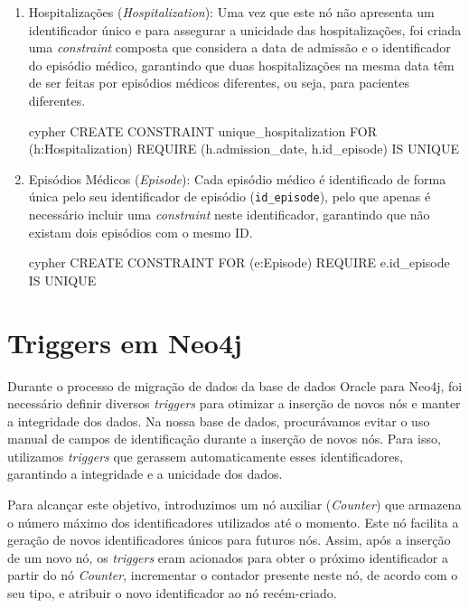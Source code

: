 \begin{enumerate}
    \item Hospitalizações (\textit{Hospitalization}): Uma vez que este nó não apresenta um identificador único e para assegurar a unicidade das hospitalizações, foi criada uma \textit{constraint} composta que considera a data de admissão e o identificador do episódio médico, garantindo que duas hospitalizações na mesma data têm de ser feitas por episódios médicos diferentes, ou seja, para pacientes diferentes. 
    
    \begin{myminted}{cypher}
    CREATE CONSTRAINT unique_hospitalization FOR (h:Hospitalization) REQUIRE (h.admission_date, h.id_episode) IS UNIQUE
    \end{myminted}
    
    \item Episódios Médicos (\textit{Episode}): Cada episódio médico é identificado de forma única pelo seu identificador de episódio (\texttt{id\_episode}), pelo que apenas é necessário incluir uma \textit{constraint} neste identificador, garantindo que não existam dois episódios com o mesmo ID.
    
    \begin{myminted}{cypher}
    CREATE CONSTRAINT FOR (e:Episode) REQUIRE e.id_episode IS UNIQUE
    \end{myminted}
\end{enumerate}

\section{Triggers em Neo4j}

Durante o processo de migração de dados da base de dados Oracle para Neo4j, foi necessário definir diversos \textit{triggers} para otimizar a inserção de novos nós e manter a integridade dos dados. Na nossa base de dados, procurávamos evitar o uso manual de campos de identificação durante a inserção de novos nós. Para isso, utilizamos \textit{triggers} que gerassem automaticamente esses identificadores, garantindo a integridade e a unicidade dos dados.

Para alcançar este objetivo, introduzimos um nó auxiliar (\textit{Counter}) que armazena o número máximo dos identificadores utilizados até o momento. Este nó facilita a geração de novos identificadores únicos para futuros nós. Assim, após a inserção de um novo nó, os \textit{triggers} eram acionados para obter o próximo identificador a partir do nó \textit{Counter}, incrementar o contador presente neste nó, de acordo com o seu tipo, e atribuir o novo identificador ao nó recém-criado.

